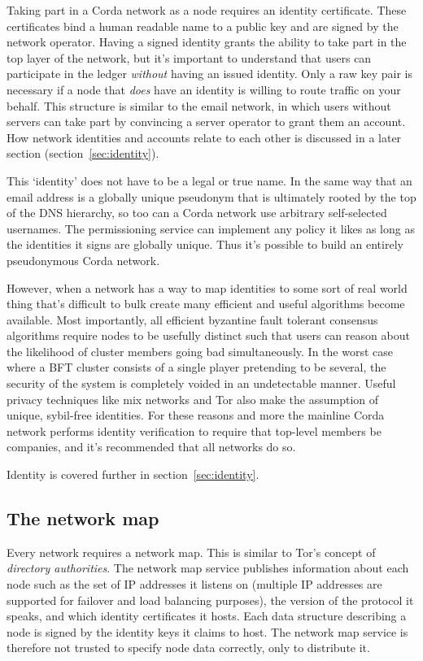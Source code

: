 \documentclass{article}
\begin{document}
Taking part in a Corda network as a node requires an identity certificate. These certificates bind a human readable
name to a public key and are signed by the network operator. Having a signed identity grants the ability to take
part in the top layer of the network, but it's important to understand that users can participate in the ledger
\emph{without} having an issued identity. Only a raw key pair is necessary if a node that \emph{does} have an
identity is willing to route traffic on your behalf. This structure is similar to the email network, in which users
without servers can take part by convincing a server operator to grant them an account. How network identities and
accounts relate to each other is discussed in a later section (section~\cref{sec:identity}).

This `identity' does not have to be a legal or true name. In the same way that an email address is a globally
unique pseudonym that is ultimately rooted by the top of the DNS hierarchy, so too can a Corda network use
arbitrary self-selected usernames. The permissioning service can implement any policy it likes as long as the
identities it signs are globally unique. Thus it's possible to build an entirely pseudonymous Corda network.

However, when a network has a way to map identities to some sort of real world thing that's difficult to bulk create
many efficient and useful algorithms become available. Most importantly, all efficient byzantine fault tolerant
consensus algorithms require nodes to be usefully distinct such that users can reason about the likelihood of cluster
members going bad simultaneously. In the worst case where a BFT cluster consists of a single player pretending to be
several, the security of the system is completely voided in an undetectable manner. Useful privacy techniques like
mix networks and Tor\cite{Dingledine:2004:TSO:1251375.1251396} also make the assumption of unique, sybil-free
identities. For these reasons and more the mainline Corda network performs identity verification to require that
top-level members be companies, and it's recommended that all networks do so.

Identity is covered further in section~\cref{sec:identity}.

\subsection{The network map}

Every network requires a network map. This is similar to Tor's concept of \emph{directory authorities}. The network
map service publishes information about each node such as the set of IP addresses it listens on (multiple IP
addresses are supported for failover and load balancing purposes), the version of the protocol it speaks, and which
identity certificates it hosts. Each data structure describing a node is signed by the identity keys it claims to
host. The network map service is therefore not trusted to specify node data correctly, only to distribute it.
\end{document}
